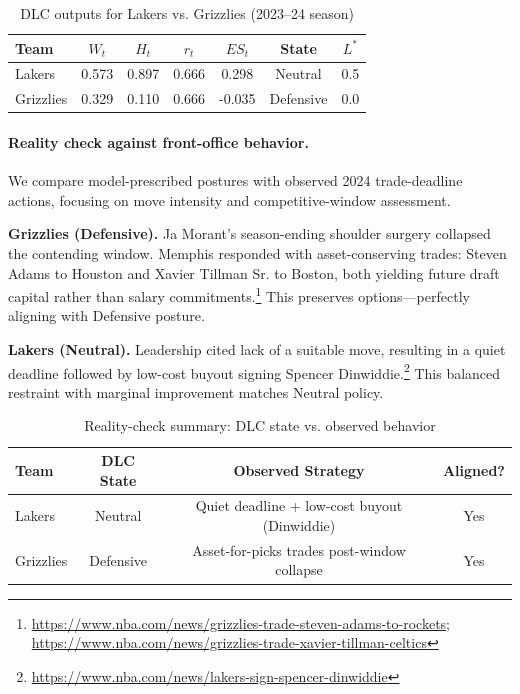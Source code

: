 \documentclass{mcmthesis}
\begin{document}
\begin{table}[htbp]
\centering
\caption{DLC outputs for Lakers vs. Grizzlies (2023--24 season)}
\label{tab:nba_case}
\begin{tabular}{@{}lcccccc@{}}
\toprule
\textbf{Team} & $W_t$ & $H_t$ & $r_t$ & $ES_t$ & \textbf{State} & $L^*$ \\
\midrule
Lakers        & 0.573 & 0.897 & 0.666 & 0.298  & Neutral        & 0.5   \\
Grizzlies     & 0.329 & 0.110 & 0.666 & -0.035 & Defensive      & 0.0   \\
\bottomrule
\end{tabular}
\end{table}



\paragraph{Reality check against front-office behavior.}
We compare model-prescribed postures with observed 2024 trade-deadline actions, focusing on move intensity and competitive-window assessment.

\textbf{Grizzlies (Defensive).} Ja Morant’s season-ending shoulder surgery collapsed the contending window.\cite{Morant2023Injury} Memphis responded with asset-conserving trades: Steven Adams to Houston and Xavier Tillman Sr. to Boston, both yielding future draft capital rather than salary commitments.\footnote{\url{https://www.nba.com/news/grizzlies-trade-steven-adams-to-rockets}; \url{https://www.nba.com/news/grizzlies-trade-xavier-tillman-celtics}} This preserves options—perfectly aligning with Defensive posture.

\textbf{Lakers (Neutral).} Leadership cited lack of a suitable move, resulting in a quiet deadline followed by low-cost buyout signing Spencer Dinwiddie.\footnote{\url{https://www.nba.com/news/lakers-sign-spencer-dinwiddie}} This balanced restraint with marginal improvement matches Neutral policy.

\begin{table}[htbp]
\centering
\caption{Reality-check summary: DLC state vs. observed behavior}
\label{tab:reality_check_summary}
\begin{tabular}{@{}lccc@{}}
\toprule
\textbf{Team}     & \textbf{DLC State} & \textbf{Observed Strategy}                          & \textbf{Aligned?} \\
\midrule
Lakers            & Neutral            & Quiet deadline + low-cost buyout (Dinwiddie)       & Yes              \\
Grizzlies         & Defensive          & Asset-for-picks trades post-window collapse        & Yes              \\
\bottomrule
\end{tabular}
\end{table}
\end{document}
